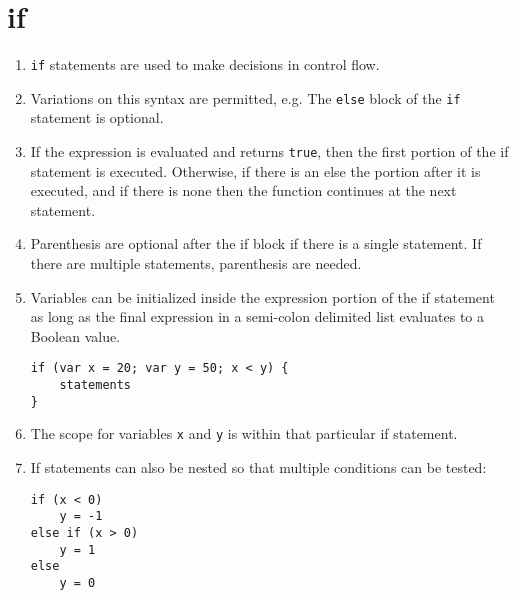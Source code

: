 \section{if}
\begin{enumerate}
\begin{lstlisting}[numbers=none]
if (expression; expression; ...) 
	statements
else 
	alternative-statements
\end{lstlisting}
	\item \lstinline|if| statements are used to make decisions in control flow.
	\item Variations on this syntax are permitted, e.g. The \lstinline|else| block of the \lstinline|if| statement is optional.
	\item If the expression is evaluated and returns \lstinline|true|, then the first portion of the if statement is executed. Otherwise, if there is an else the portion after it is executed, and if there is none then the function continues at the next statement.
	\item Parenthesis are optional after the if block if there is a single statement. If there are multiple statements, parenthesis are needed.
	\item Variables can be initialized inside the expression portion of the if statement as long as the final expression in a semi-colon delimited list evaluates to a Boolean value.
\begin{lstlisting}[numbers=none]
if (var x = 20; var y = 50; x < y) {
	statements
}
\end{lstlisting}
	\item The scope for variables \lstinline|x| and \lstinline|y| is within that particular if statement.
	\item If statements can also be nested so that multiple conditions can be tested:
\begin{lstlisting}[numbers=none]
if (x < 0) 
	y = -1
else if (x > 0)
	y = 1
else
	y = 0
\end{lstlisting}
\end{enumerate}
